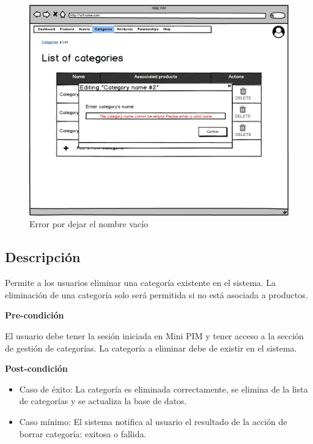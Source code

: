 \begin{figure}[H]
    \includegraphics[width=1\linewidth]{mockups/RF4.3_2.png}
    \caption{Error por dejar el nombre vacío}
   \end{figure}
\vspace{1.0cm}


\subsection*{Descripción}
Permite a los usuarios eliminar una categoría existente en el sistema. La eliminación de una categoría solo será permitida si no está asociada a productos. \par
\vspace{0.15cm}

\textbf{Pre-condición}\par
El usuario debe tener la sesión iniciada en Mini PIM y tener acceso a la sección de gestión de categorías. La categoría a eliminar debe de existir en el sistema. \par
\vspace{0.15cm}

\textbf{Post-condición}
\begin{itemize}
    \item Caso de éxito: La categoría es eliminada correctamente, se elimina de la lista de categorías y se actualiza la base de datos.
    \item Caso mínimo: El sistema notifica al usuario el resultado de la acción de borrar categoría: exitosa o fallida.
\end{itemize}

